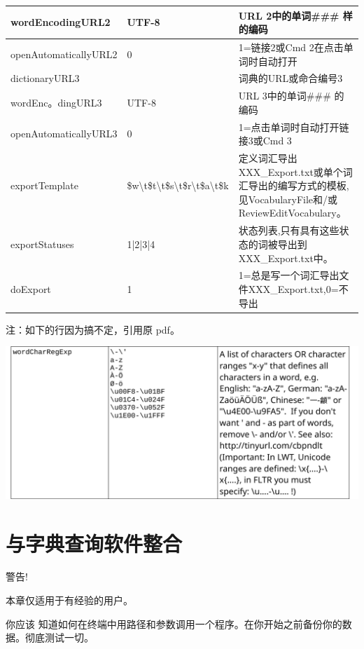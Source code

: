 \documentclass[cn,10pt,math=newtx,citestyle=gb7714-2015,bibstyle=gb7714-2015]{elegantbook}
\begin{document}
\begin{table}[htbp]
\begin{tabularx}{\textwidth}{|X|X|X|}
	wordEncodingURL2 & UTF-8 & URL 2中的单词\#\#\# 样的编码 \\ \hline
	openAutomaticallyURL2 & 0 & 1=链接2或Cmd 2在点击单词时自动打开 \\ \hline
	dictionaryURL3 &  & 词典的URL或命合编号3 \\ \hline
	wordEnc。dingURL3 & UTF-8 & URL 3中的单词\#\#\# 的编码 \\ \hline
		
	openAutomaticallyURL3 & 0  & 1=点击单词时自动打开链接3或Cmd 3 \\ \hline

exportTemplate & \$w\textbackslash{}t\$t\textbackslash{}t\$s\textbackslash{}t\$r\textbackslash{}t\$a\textbackslash{}t\$k & 定义词汇导出XXX\_Export.txt或单个词汇导出的编写方式的模板,见VocabularyFile和/或ReviewEditVocabulary。\\ \hline

	exportStatuses & 1|2|3|4 &状态列表,只有具有这些状态的词被导出到XXX\_Export.txt中。\\ \hline
doExport & 1 & 1=总是写一个词汇导出文件XXX\_Export.txt,0=不导出 \\ \hline
\end{tabularx}
\end{table}

注：如下的行因为搞不定，引用原 pdf。

\includegraphics[width=\textwidth]{image/table2.png}


\chapter{与字典查询软件整合}\label{与字典查询软件整合}
\begin{bclogo}[logo=\bcattention, noborder=false, barre=none]{警告!} %

本章仅适用于有经验的用户。

你应该 知道如何在终端中用路径和参数调用一个程序。在你开始之前备份你的数据。彻底测试一切。
\end{bclogo}
\end{document}
